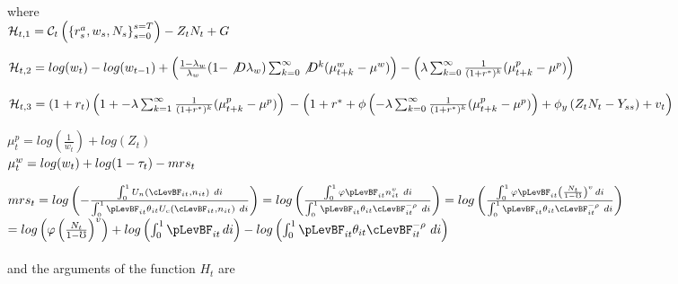\documentclass[titlepage]{\econtex}\providecommand{\texname}{BufferStockTheory}
\begin{document}
 where \\ 
 
 
 $\mathcal{H}_{t,1}  =\mathcal{C}_{t}\left( \left \{r^{a}_{s} , w_{s} , N_{s}  \right \}_{s=0}^{s=T} \right) - Z_{t} N_{t} + G\\ \\ $

$ \mathcal{H}_{t,2}  =log(w_{t}) - log(w_{t-1}) + \left( \frac{1 - \lambda_{w}}{\lambda_{w}}(1 - \not D \lambda_{w}) \sum_{k=0}^{\infty} \not D^{k} ( \mu_{t+k}^{w} - \mu^{w}) \right) - \left(  \lambda \sum_{k=0}^{\infty} \frac{1}{(1+r^{*})^{k}} ( \mu_{t+k}^{p} - \mu^{p})\right)\\ \\ $

$ \mathcal{H}_{t,3}  =  (1+r_{t}) \left(1+ -\lambda \sum_{k=1}^{\infty} \frac{1}{(1+r^{*})^{k}} ( \mu_{t+k}^{p} - \mu^{p}) \right) \\ \\
 - \left(1+r^{*}+ \phi \left(- \lambda \sum_{k=0}^{\infty} \frac{1}{(1+r^{*})^{k}} ( \mu_{t+k}^{p} - \mu^{p}) \right) +\phi_{y} \left(Z_{t} N_{t} - Y_{ss} \right) + v_{t}\right) \\ \\ $
 
$ \mu_{t}^{p} = log(\frac{1}{w_{t}}) + log(Z_{t})$ \\ 

$\mu_{t}^{w} = log(w_{t}) + log(1 - \tau_{t}) - mrs_{t} \\  $

$mrs_{t} = log \left(- \frac{\int_{0}^{1}   U_{n} \left(\cLevBF_{i t}, n_{i t} \right) \ d i  }{\int_{0}^{1} \pLevBF_{it} \theta_{it} U_{c} \left(\cLevBF_{i t}, n_{i t} \right) \  di } \right) = log \left(\frac{\int_{0}^{1} \varphi \pLevBF_{it} n_{it}^{v} \ d i  }{\int_{0}^{1} \pLevBF_{it}  \theta_{it} \cLevBF_{it}^{-\rho} \  di } \right) = log \left(\frac{\int_{0}^{1} \varphi \pLevBF_{it} \left(\frac{N_{t}}{1 - \mho} \right)^{v} \, d i  }{\int_{0}^{1} \pLevBF_{it}  \theta_{it} \cLevBF_{it}^{-\rho} \  di } \right)$ \\ 

$ = log \left( \varphi \left(\frac{N_{t}}{1 - \mho}\right) ^{v}\right) + log \left(\int_{0}^{1} \pLevBF_{it}  \,  di  \right) - log \left(\int_{0}^{1} \pLevBF_{it}  \theta_{it} \cLevBF_{it}^{-\rho} \  di  \right) $ \\ \\
 
 and the arguments of the function $H_{t}$ are \\
 
\end{document}
